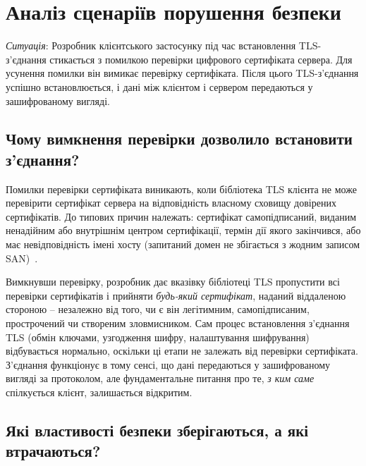 \section{Аналіз сценаріїв порушення безпеки}
\label{sec:task4}

\textit{Ситуація}: Розробник клієнтського застосунку під час встановлення TLS-з'єднання стикається з помилкою 
перевірки цифрового сертифіката сервера. Для усунення помилки він вимикає перевірку сертифіката. Після цього 
TLS-з'єднання успішно встановлюється, і дані між клієнтом і сервером передаються у зашифрованому вигляді.

\subsection*{Чому вимкнення перевірки дозволило встановити з'єднання?}

Помилки перевірки сертифіката виникають, коли бібліотека TLS клієнта не може перевірити сертифікат сервера на 
відповідність власному сховищу довірених сертифікатів. До типових причин належать: сертифікат самопідписаний, 
виданим ненадійним або внутрішнім центром сертифікації, термін дії якого закінчився, або має невідповідність 
імені хосту (запитаний домен не збігається з жодним записом SAN)~\cite{rfc5280}.

Вимкнувши перевірку, розробник дає вказівку бібліотеці TLS пропустити всі перевірки сертифікатів і прийняти 
\textit{будь-який сертифікат}, наданий віддаленою стороною -- незалежно від того, чи є він легітимним, самопідписаним, 
прострочений чи створеним зловмисником. Сам процес встановлення з'єднання TLS (обмін ключами, узгодження шифру, 
налаштування шифрування) відбувається нормально, оскільки ці етапи не залежать від перевірки сертифіката. 
З'єднання функціонує в тому сенсі, що дані передаються у зашифрованому вигляді за протоколом, але фундаментальне 
питання про те, \textit{з ким саме} спілкується клієнт, залишається відкритим.

\subsection*{Які властивості безпеки зберігаються, а які втрачаються?}

